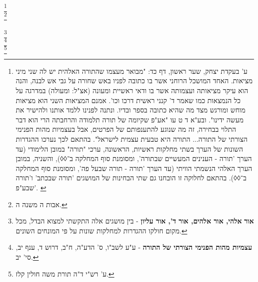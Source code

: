 \begin{multicols}{2}
\\

\footnote{ ע' בעקדת יצחק, שער ראשון, דף כד: "מבואר מעצמו שהתורה האלהית יש לה שני מיני מציאות. האחד המושכל הרוחני אשר בו כתובה לפניו באש שחורה על גבי אש לבנה, והנה הוא עיקר מציאותה ועצמותה אשר בו ודאי ראשיית ומעונה (אצ"ל: ומעולה) במדרגה על כל הנמצאות כמו שאמר ד' קנני ראשית דרכו וכו'. אמנם המציאות השני הוא מציאות מוחש ומורגש מצד מה שהיא כתובה בספר ובדיו. ונתנה לפנינו ללמד אותנו ולהישיר את מעשה ידינו". ובע"א ד ט עו "אע"פ שקיומה של תורה תלמודה והרחבתה הרי הוא דבר התלוי בבחירה, זה מה שנוגע להתענפותם של הפרטים, אבל בעצמיות מהות הפנימי הצורתי של התורה... התורה היא טבעית עצמית לישראל". בהתאם לכך נערכו ההגדרות השונות של הערך בשתי מחלקות ראשיות, הראשונה, ערכי "תורה" במובן הלימודי (עד הערך 'תורה - הענינים המעשיים שבתורה', ומסומנת סוף המחלקה ב־◊◊), והשניה, במובן הערך האלהי הנשמתי הוויתי (עד הערך 'תורה - תורה שבעל פה', ומסומנת סוף המחלקה ב־◊◊). בהתאם לחלוקה זו הובחנו גם שתי הבחינות של המושגים 'תורה שבכתב' ו'תורה שבע"פ'. \label{14}}\\

\footnote{ אבות ה משנה ה.\label{15}}\\

\\

\footnote{ \textbf{אור}\textbf{ אלהי, אור אלהים, אור ד', אור עליון }- בין מושגים אלה התקשתי למצוא הבדל, מכל מקום חולקו ההגדרות למחלקות שונות על פי המונחים השונים.\label{16}}\\

\footnote{ \textbf{עצמיות מהות הפנימי הצורתי של התורה }- ע"ע לשב"ו, ס' הדע"ה, ח"ב, דרוש ד, ענף יב, סי' יב.\label{17}}\\

\footnote{ ע' רש"י ד"ה תורת משה חולין קלז.\label{18}}\\


\end{multicols}
